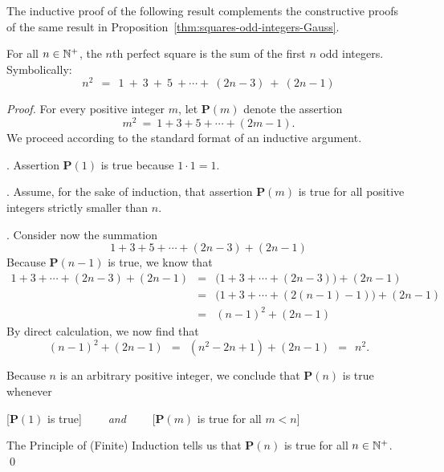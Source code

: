 \smallskip

The inductive proof of the following result complements the constructive proofs of the same result in Proposition~\ref{thm:squares-odd-integers-Gauss}.

\begin{prop}
\label{thm:squares-odd-integers-induction1}
For all $n \in \mathbb{N}^+$, the $n$th perfect square is the sum of the first $n$ odd integers. Symbolically:
\[
n^2 \ \ = \ \
1 \ + \ 3 \ + \ 5 \ + \cdots + \ (2n-3) \ + \ (2n-1)
\]
\end{prop}

\begin{proof}
For every positive integer $m$, let {\bf P}$(m)$ denote the assertion
\[ m^2 \ = \ 1 + 3 + 5 + \cdots + (2m-1). \]
We proceed according to the standard format of an inductive argument.

\smallskip

.
Assertion {\bf P}$(1)$ is true because $1 \cdot 1 = 1$.

\smallskip

.
Assume, for the sake of induction, that assertion {\bf P}$(m)$ is true for all positive integers strictly smaller than $n$.

\smallskip

.
Consider now the summation
\[ 1 + 3 + 5 + \cdots + (2n-3) + (2n-1) \]
Because {\bf P}$(n-1)$ is true, we know that
\begin{eqnarray*}
1 + 3 + \cdots + (2n-3) + (2n-1)
  & = & 
\big(1 + 3 + \cdots + (2n-3) \big) + (2n-1) \\
  & = &
\big(1 + 3 + \cdots + (2(n-1) -1) \big) + (2n-1) \\
  & = & (n-1)^2 + (2n-1)
\end{eqnarray*}
By direct calculation, we now find that
\[ (n-1)^2 + (2n-1) \ \ = \ \ (n^2 -2n +1) + (2n-1) \ \ = \ \ n^2. \]

\smallskip

\noindent
Because $n$ is an arbitrary positive integer, we conclude that {\bf P}$(n)$ is true whenever

\hspace*{.35in}[{\bf P}$(1)$ is true] \ \ \ \ {\em and} \ \ \ \
[{\bf P}$(m)$ is true for all $m < n$]

\noindent
The Principle of (Finite) Induction tells us that {\bf P}$(n)$ is true for all $n \in \mathbb{N}^+$.  \qed
\end{proof}

